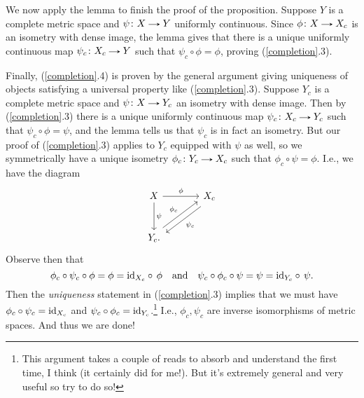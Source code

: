 \begin{nothing}
  We now apply the lemma to finish the proof of the proposition. Suppose
  $Y$ is a complete metric space and $\psi \c X \to Y$ uniformly
  continuous. Since $\phi \c X \to X_c$ is an isometry with dense image,
  the lemma gives that there is a unique uniformly continuous map
  $\psi_c \c X_c \to Y$ such that $\psi_c \circ \phi = \phi$, proving
  (\ref{completion}.3).

  Finally, (\ref{completion}.4) is proven by the general argument giving
  uniqueness of objects satisfying a universal property like
  (\ref{completion}.3). Suppose $Y_c$ is a complete metric space and
  $\psi \c X \to Y_c$ an isometry with dense image. Then by
  (\ref{completion}.3) there is a unique uniformly continuous map
  $\psi_c \c X_c \to Y_c$ such that $\psi_c \circ \phi = \psi$, and the
  lemma tells us that $\psi_c$ is in fact an isometry. But our proof of
  (\ref{completion}.3) applies to $Y_c$ equipped with $\psi$ as well, so
  we symmetrically have a unique isometry $\phi_c \c Y_c \to X_c$ such
  that $\phi_c \circ \psi = \phi$. I.e., we have the diagram
  \[
  \begin{tikzcd}[column sep = large, row sep = large]
    X \rar{\phi} \dar{\psi} & X_c \ar[shift left = .7ex]{dl}{\psi_c}
    \\ Y_c \ar[shift left = .7ex]{ur}{\phi_c}.
  \end{tikzcd}
  \]
  Observe then that
  \[
  \phi_c \circ \psi_c \circ \phi = \phi = \mathrm{id}_{X_c} \circ\, \phi
  \quad\text{and}\quad \psi_c \circ \phi_c \circ \psi = \psi = \mathrm{id}_{Y_c}
  \circ\, \psi.
  \]
  Then the \textit{uniqueness} statement in (\ref{completion}.3)
  implies that we must have $\phi_c \circ \psi_c = \mathrm{id}_{X_c}$ and
  $\psi_c \circ \phi_c = \mathrm{id}_{Y_c}$.\footnote{This argument takes a
    couple of reads to absorb and understand the first time, I think
    (it certainly did for me!). But it's extremely general and very
    useful so try to do so!} I.e., $\phi_c,\psi_c$ are inverse
  isomorphisms of metric spaces. And thus we are done!
\end{nothing}


